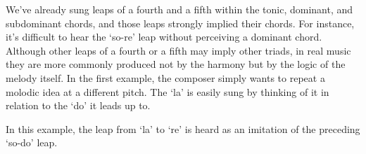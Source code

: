 \documentclass{sight}
\begin{document}
\pagebreak[3]\par
\vspace{5mm}\begin{samepage}We've already sung leaps of a fourth and a fifth within the tonic, dominant, and subdominant chords, and those leaps strongly implied their chords. For instance, it's difficult to hear the `so-re' leap without perceiving a dominant chord. Although other leaps of a fourth or a fifth may imply other triads, in real music they are more commonly produced not by the harmony but by the logic of the melody itself. In the first example, the composer simply wants to repeat a molodic idea at a different pitch. The `la' is easily sung by thinking of it in relation to the `do' it leads up to.\\


\pagebreak[3]\par
\par
{}
%
%
\label{tune:322}%
{%
\parindent 0pt
\noindent
\ifx\preLilyPondExample \undefined
\else
  \expandafter\preLilyPondExample
\fi
\def\lilypondbook{}%

\ifx\postLilyPondExample \undefined
\else
  \expandafter\postLilyPondExample
\fi
}
\end{samepage}


\pagebreak[3]\par
\vspace{5mm}\begin{samepage}In this example, the leap from `la' to `re' is heard as an imitation of the preceding `so-do' leap.\\


\pagebreak[3]\par
\par
{}
\label{tune:323}%
{%
\parindent 0pt
\noindent
\ifx\preLilyPondExample \undefined
\else
  \expandafter\preLilyPondExample
\fi
\def\lilypondbook{}%

\ifx\postLilyPondExample \undefined
\else
  \expandafter\postLilyPondExample
\fi
}
\end{samepage}
\end{document}
